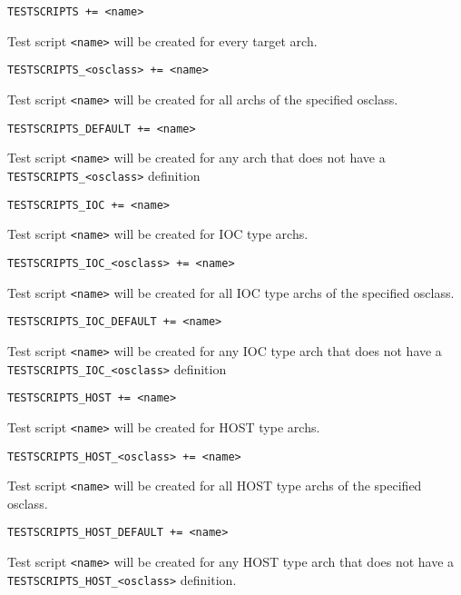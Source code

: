 \begin{description}

\item {}\verb|TESTSCRIPTS += <name>|

Test script \verb|<name>| will be created for every target arch.

\item \verb|TESTSCRIPTS_<osclass> += <name>|

Test script \verb|<name>| will be created for all archs of the specified osclass.

\item \verb|TESTSCRIPTS_DEFAULT += <name>|

Test script \verb|<name>| will be created for any arch that does not have a \\
\verb|TESTSCRIPTS_<osclass>| definition

\item 

\item {}\verb|TESTSCRIPTS_IOC += <name>|

Test script \verb|<name>| will be created for IOC type archs.

\item \verb|TESTSCRIPTS_IOC_<osclass> += <name>|

Test script \verb|<name>| will be created for all IOC type archs of the specified osclass.

\item \verb|TESTSCRIPTS_IOC_DEFAULT += <name>|

Test script \verb|<name>| will be created for any IOC type arch that does not have a \\
\verb|TESTSCRIPTS_IOC_<osclass>| definition

\item

\item {}\verb|TESTSCRIPTS_HOST += <name>|

Test script \verb|<name>| will be created for HOST type archs.

\item \verb|TESTSCRIPTS_HOST_<osclass> += <name>|

Test script \verb|<name>| will be created for all HOST type archs of the specified osclass.

\item \verb|TESTSCRIPTS_HOST_DEFAULT += <name>|

Test script \verb|<name>| will be created for any HOST type arch that does not have a \\
\verb|TESTSCRIPTS_HOST_<osclass>| definition.

\end{description}

